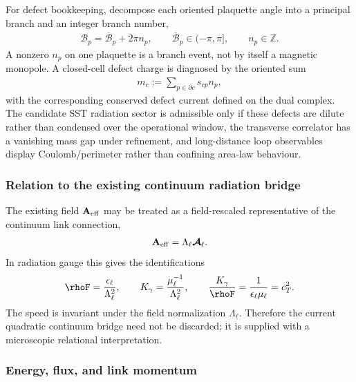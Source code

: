 For defect bookkeeping, decompose each oriented plaquette angle into a principal
branch and an integer branch number,
\begin{align}
    \mathscr B_p
    =
    \overline{\mathscr B}_p+2\pi n_p,
    \qquad
    \overline{\mathscr B}_p\in(-\pi,\pi],
    \qquad
    n_p\in\mathbb Z.
    \label{eq:rt_compact_plaquette_branch_decomposition}
\end{align}
A nonzero \(n_p\) on one plaquette is a branch event, not by itself a magnetic
monopole.  A closed-cell defect charge is diagnosed by the oriented sum
\begin{align}
    m_c
    :=
    \sum_{p\in\partial c}s_{cp}n_p,
    \label{eq:rt_compact_closed_cell_defect_charge}
\end{align}
with the corresponding conserved defect current defined on the dual complex.
The candidate SST radiation sector is admissible only if these defects are
dilute rather than condensed over the operational window, the transverse
correlator has a vanishing mass gap under refinement, and long-distance loop
observables display Coulomb/perimeter rather than confining area-law behaviour.

\subsubsection{Relation to the existing continuum radiation bridge}

The existing field $\mathbf A_{\rm eff}$ may be treated as a field-rescaled
representative of the continuum link connection,
\begin{align}
    \mathbf A_{\rm eff}
    =
    \Lambda_\ell\boldsymbol{\mathcal A}_\ell.
\end{align}
In radiation gauge this gives the identifications
\begin{align}
    \rhoF
    =
    \frac{\epsilon_\ell}{\Lambda_\ell^2},
    \qquad
    K_\gamma
    =
    \frac{\mu_\ell^{-1}}{\Lambda_\ell^2},
    \qquad
    \frac{K_\gamma}{\rhoF}
    =
    \frac{1}{\epsilon_\ell\mu_\ell}
    =c_T^2.
    \label{eq:rt_link_to_Aeff_normalization}
\end{align}
The speed is invariant under the field normalization $\Lambda_\ell$.  Therefore
the current quadratic continuum bridge need not be discarded; it is supplied
with a microscopic relational interpretation.

\subsubsection{Energy, flux, and link momentum}


